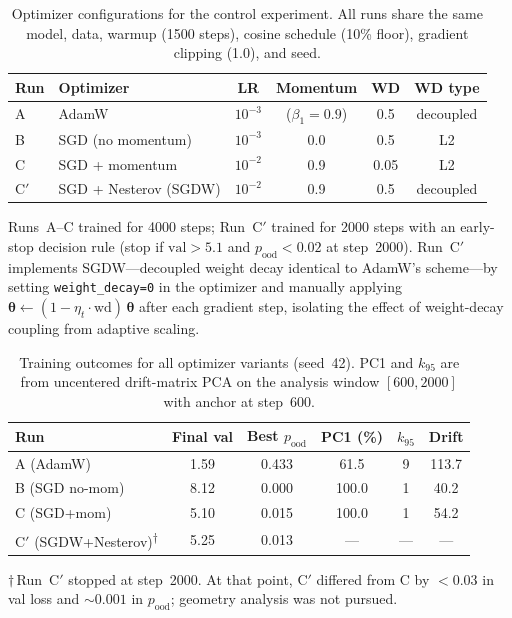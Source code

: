 \documentclass[11pt,a4paper]{article}
\begin{document}
\begin{table}[t]
\centering
\caption{Optimizer configurations for the control experiment.  All runs share
         the same model, data, warmup (1500 steps), cosine schedule (10\%
         floor), gradient clipping (1.0), and seed.}
\label{tab:sgd-configs}
\begin{tabular}{@{}llcccc@{}}
\toprule
\textbf{Run} & \textbf{Optimizer} & \textbf{LR} & \textbf{Momentum} &
\textbf{WD} & \textbf{WD type} \\
\midrule
A  & AdamW             & $10^{-3}$ & ($\beta_1{=}0.9$) & 0.5  & decoupled \\
B  & SGD (no momentum) & $10^{-3}$ & 0.0               & 0.5  & L2 \\
C  & SGD + momentum    & $10^{-2}$ & 0.9               & 0.05 & L2 \\
C$'$ & SGD + Nesterov (SGDW) & $10^{-2}$ & 0.9        & 0.5  & decoupled \\
\bottomrule
\end{tabular}
\end{table}

Runs~A--C trained for 4000 steps; Run~C$'$ trained for 2000 steps with an
early-stop decision rule (stop if $\text{val} > 5.1$ and
$p_{\mathrm{ood}} < 0.02$ at step~2000).  Run~C$'$ implements SGDW---decoupled
weight decay identical to AdamW's scheme---by setting \texttt{weight\_decay=0}
in the optimizer and manually applying
$\bm{\theta} \leftarrow (1 - \eta_t \cdot \text{wd})\,\bm{\theta}$ after each
gradient step, isolating the effect of weight-decay coupling from adaptive
scaling.

\begin{table}[t]
\centering
\caption{Training outcomes for all optimizer variants (seed~42).  PC1 and
         $k_{95}$ are from uncentered drift-matrix PCA on the analysis window
         $[600, 2000]$ with anchor at step~600.}
\label{tab:sgd-results}
\begin{tabular}{@{}lccccc@{}}
\toprule
\textbf{Run} & \textbf{Final val} & \textbf{Best $p_{\mathrm{ood}}$} &
\textbf{PC1 (\%)} & $k_{95}$ & \textbf{Drift} \\
\midrule
A (AdamW)         & 1.59  & 0.433 & 61.5 &  9 & 113.7 \\
B (SGD no-mom)    & 8.12  & 0.000 & 100.0 & 1 &  40.2 \\
C (SGD+mom)       & 5.10  & 0.015 & 100.0 & 1 &  54.2 \\
C$'$ (SGDW+Nesterov)\textsuperscript{$\dagger$}
                  & 5.25  & 0.013 & ---   & --- & --- \\
\bottomrule
\end{tabular}
\par\smallskip
{\footnotesize $\dagger$\,Run~C$'$ stopped at step~2000.  At that point,
C$'$ differed from C by $<$0.03 in val loss and ${\sim}0.001$ in
$p_{\mathrm{ood}}$; geometry analysis was not pursued.}
\end{table}
\end{document}
